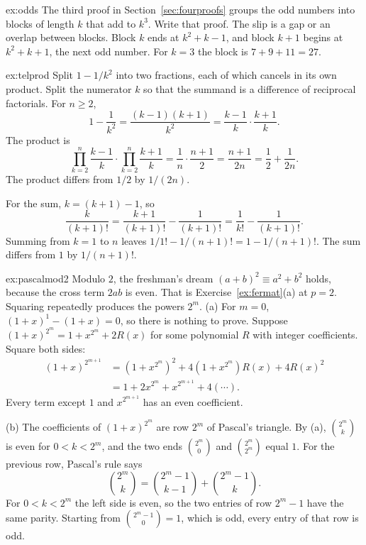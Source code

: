 \begin{solution}{ex:odds}
\idea The third proof in Section~\ref{sec:fourproofs} groups the odd numbers into blocks of length $k$ that add to $k^3$.
\writeup Write that proof. The slip is a gap or an overlap between blocks. Block $k$ ends at $k^2+k-1$, and block $k+1$ begins at $k^2+k+1$, the next odd number. For $k=3$ the block is $7+9+11=27$.
\end{solution}

\begin{solution}{ex:telprod}
\idea Split $1-1/k^2$ into two fractions, each of which cancels in its own product. Split the numerator $k$ so that the summand is a difference of reciprocal factorials.
\writeup For $n\ge2$,
\[
1-\frac1{k^2}=\frac{(k-1)(k+1)}{k^2}=\frac{k-1}{k}\cdot\frac{k+1}{k}.
\]
The product is
\[
\prod_{k=2}^n\frac{k-1}{k}\cdot\prod_{k=2}^n\frac{k+1}{k}=\frac1n\cdot\frac{n+1}{2}=\frac{n+1}{2n}=\frac12+\frac1{2n}.
\]
The product differs from $1/2$ by $1/(2n)$.

For the sum, $k=(k+1)-1$, so
\[
\frac{k}{(k+1)!}=\frac{k+1}{(k+1)!}-\frac1{(k+1)!}=\frac1{k!}-\frac1{(k+1)!}.
\]
Summing from $k=1$ to $n$ leaves $1/1!-1/(n+1)!=1-1/(n+1)!$. The sum differs from $1$ by $1/(n+1)!$.
\end{solution}

\begin{solution}{ex:pascalmod2}
\idea Modulo $2$, the freshman's dream $(a+b)^2\equiv a^2+b^2$ holds, because the cross term $2ab$ is even. That is Exercise~\ref{ex:fermat}(a) at $p=2$. Squaring repeatedly produces the powers $2^m$.
\writeup (a) For $m=0$, $(1+x)^1-(1+x)=0$, so there is nothing to prove. Suppose $(1+x)^{2^m}=1+x^{2^m}+2R(x)$ for some polynomial $R$ with integer coefficients. Square both sides:
\begin{align*}
(1+x)^{2^{m+1}}
&=(1+x^{2^m})^2+4(1+x^{2^m})R(x)+4R(x)^2\\
&=1+2x^{2^m}+x^{2^{m+1}}+4(\cdots).
\end{align*}
Every term except $1$ and $x^{2^{m+1}}$ has an even coefficient.

(b) The coefficients of $(1+x)^{2^m}$ are row $2^m$ of Pascal's triangle. By (a), $\binom{2^m}{k}$ is even for $0<k<2^m$, and the two ends $\binom{2^m}{0}$ and $\binom{2^m}{2^m}$ equal $1$. For the previous row, Pascal's rule says
\[
\binom{2^m}{k}=\binom{2^m-1}{k-1}+\binom{2^m-1}{k}.
\]
For $0<k<2^m$ the left side is even, so the two entries of row $2^m-1$ have the same parity. Starting from $\binom{2^m-1}{0}=1$, which is odd, every entry of that row is odd.
\end{solution}

